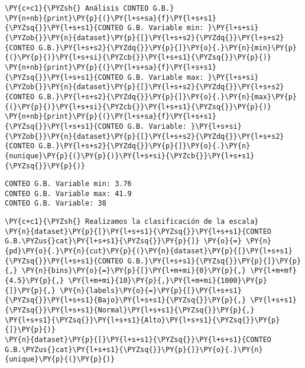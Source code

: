     \begin{tcolorbox}[breakable, size=fbox, boxrule=1pt, pad at break*=1mm,colback=cellbackground, colframe=cellborder]
\begin{Verbatim}[commandchars=\\\{\}]
\PY{c+c1}{\PYZsh{} Análisis CONTEO G.B.}
\PY{n+nb}{print}\PY{p}{(}\PY{l+s+sa}{f}\PY{l+s+s1}{\PYZsq{}}\PY{l+s+s1}{CONTEO G.B. Variable min: }\PY{l+s+si}{\PYZob{}}\PY{n}{dataset}\PY{p}{[}\PY{l+s+s2}{\PYZdq{}}\PY{l+s+s2}{CONTEO G.B.}\PY{l+s+s2}{\PYZdq{}}\PY{p}{]}\PY{o}{.}\PY{n}{min}\PY{p}{(}\PY{p}{)}\PY{l+s+si}{\PYZcb{}}\PY{l+s+s1}{\PYZsq{}}\PY{p}{)}
\PY{n+nb}{print}\PY{p}{(}\PY{l+s+sa}{f}\PY{l+s+s1}{\PYZsq{}}\PY{l+s+s1}{CONTEO G.B. Variable max: }\PY{l+s+si}{\PYZob{}}\PY{n}{dataset}\PY{p}{[}\PY{l+s+s2}{\PYZdq{}}\PY{l+s+s2}{CONTEO G.B.}\PY{l+s+s2}{\PYZdq{}}\PY{p}{]}\PY{o}{.}\PY{n}{max}\PY{p}{(}\PY{p}{)}\PY{l+s+si}{\PYZcb{}}\PY{l+s+s1}{\PYZsq{}}\PY{p}{)}
\PY{n+nb}{print}\PY{p}{(}\PY{l+s+sa}{f}\PY{l+s+s1}{\PYZsq{}}\PY{l+s+s1}{CONTEO G.B. Variable: }\PY{l+s+si}{\PYZob{}}\PY{n}{dataset}\PY{p}{[}\PY{l+s+s2}{\PYZdq{}}\PY{l+s+s2}{CONTEO G.B.}\PY{l+s+s2}{\PYZdq{}}\PY{p}{]}\PY{o}{.}\PY{n}{nunique}\PY{p}{(}\PY{p}{)}\PY{l+s+si}{\PYZcb{}}\PY{l+s+s1}{\PYZsq{}}\PY{p}{)}
\end{Verbatim}
\end{tcolorbox}

    \begin{Verbatim}[commandchars=\\\{\}]
CONTEO G.B. Variable min: 3.76
CONTEO G.B. Variable max: 41.9
CONTEO G.B. Variable: 38
    \end{Verbatim}

    \begin{tcolorbox}[breakable, size=fbox, boxrule=1pt, pad at break*=1mm,colback=cellbackground, colframe=cellborder]
\begin{Verbatim}[commandchars=\\\{\}]
\PY{c+c1}{\PYZsh{} Realizamos la clasificación de la escala}
\PY{n}{dataset}\PY{p}{[}\PY{l+s+s1}{\PYZsq{}}\PY{l+s+s1}{CONTEO G.B.\PYZus{}cat}\PY{l+s+s1}{\PYZsq{}}\PY{p}{]} \PY{o}{=} \PY{n}{pd}\PY{o}{.}\PY{n}{cut}\PY{p}{(}\PY{n}{dataset}\PY{p}{[}\PY{l+s+s1}{\PYZsq{}}\PY{l+s+s1}{CONTEO G.B.}\PY{l+s+s1}{\PYZsq{}}\PY{p}{]}\PY{p}{,} \PY{n}{bins}\PY{o}{=}\PY{p}{[}\PY{l+m+mi}{0}\PY{p}{,} \PY{l+m+mf}{4.5}\PY{p}{,} \PY{l+m+mi}{10}\PY{p}{,}\PY{l+m+mi}{1000}\PY{p}{]}\PY{p}{,} \PY{n}{labels}\PY{o}{=}\PY{p}{[}\PY{l+s+s1}{\PYZsq{}}\PY{l+s+s1}{Bajo}\PY{l+s+s1}{\PYZsq{}}\PY{p}{,} \PY{l+s+s1}{\PYZsq{}}\PY{l+s+s1}{Normal}\PY{l+s+s1}{\PYZsq{}}\PY{p}{,} \PY{l+s+s1}{\PYZsq{}}\PY{l+s+s1}{Alto}\PY{l+s+s1}{\PYZsq{}}\PY{p}{]}\PY{p}{)}
\PY{n}{dataset}\PY{p}{[}\PY{l+s+s1}{\PYZsq{}}\PY{l+s+s1}{CONTEO G.B.\PYZus{}cat}\PY{l+s+s1}{\PYZsq{}}\PY{p}{]}\PY{o}{.}\PY{n}{unique}\PY{p}{(}\PY{p}{)}
\end{Verbatim}
\end{tcolorbox}

